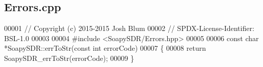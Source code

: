 \subsection{Errors.\+cpp}
\label{Errors_8cpp_source}

\begin{DoxyCode}
00001 \textcolor{comment}{// Copyright (c) 2015-2015 Josh Blum}
00002 \textcolor{comment}{// SPDX-License-Identifier: BSL-1.0}
00003 
00004 \textcolor{preprocessor}{#include <SoapySDR/Errors.hpp>}
00005 
00006 \textcolor{keyword}{const} \textcolor{keywordtype}{char} *SoapySDR::errToStr(\textcolor{keyword}{const} \textcolor{keywordtype}{int} errorCode)
00007 \{
00008     \textcolor{keywordflow}{return} SoapySDR_errToStr(errorCode);
00009 \}
\end{DoxyCode}
